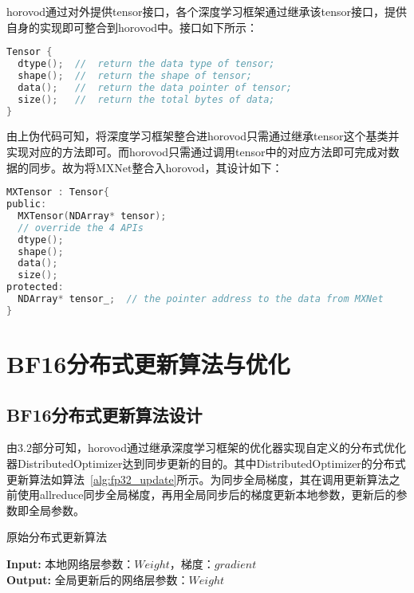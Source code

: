 horovod通过对外提供tensor接口，各个深度学习框架通过继承该tensor接口，提供自身的实现即可整合到horovod中。接口如下所示：

\begin{lstlisting}[language=C, numbers=none]
Tensor {
  dtype();  //  return the data type of tensor;
  shape();  //  return the shape of tensor;
  data();   //  return the data pointer of tensor;
  size();   //  return the total bytes of data;
}
\end{lstlisting}

由上伪代码可知，将深度学习框架整合进horovod只需通过继承tensor这个基类并实现对应的方法即可。而horovod只需通过调用tensor中的对应方法即可完成对数据的同步。故为将MXNet整合入horovod，其设计如下：

\begin{lstlisting}[language=C, numbers=none]
MXTensor : Tensor{
public:
  MXTensor(NDArray* tensor);
  // override the 4 APIs
  dtype();
  shape();
  data();
  size();
protected:
  NDArray* tensor_;  // the pointer address to the data from MXNet
}
\end{lstlisting}

\section{BF16分布式更新算法与优化}
\subsection{BF16分布式更新算法设计}
由3.2部分可知，horovod通过继承深度学习框架的优化器实现自定义的分布式优化器DistributedOptimizer达到同步更新的目的。其中DistributedOptimizer的分布式更新算法如算法~\ref{alg:fp32_update}所示。为同步全局梯度，其在调用更新算法之前使用allreduce同步全局梯度，再用全局同步后的梯度更新本地参数，更新后的参数即全局参数。

\begin{algorithm}\small
\caption{原始分布式更新算法}
\textbf{Input:}
本地网络层参数：$Weight$，梯度：$gradient$ \\
\textbf{Output:} 
全局更新后的网络层参数：$Weight$
\begin{algorithmic}[1]
\end{algorithmic}
	\label{alg:fp32_update}
\end{algorithm}


